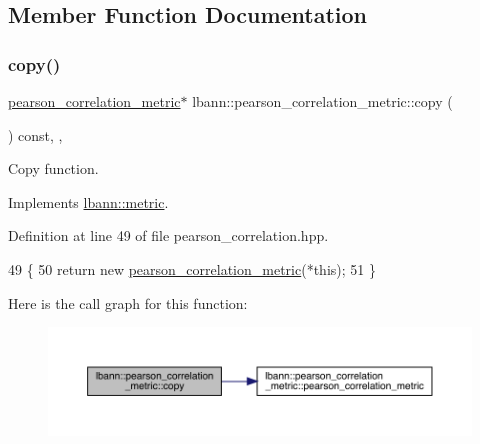 \subsection{Member Function Documentation}
\mbox{\label{classlbann_1_1pearson__correlation__metric_a2bb107028c6931a70ed7d886707b4006}} 
\subsubsection{\texorpdfstring{copy()}{copy()}}
{\footnotesize\ttfamily \hyperlink{classlbann_1_1pearson__correlation__metric}{pearson\+\_\+correlation\+\_\+metric}$\ast$ lbann\+::pearson\+\_\+correlation\+\_\+metric\+::copy (\begin{DoxyParamCaption}{ }\end{DoxyParamCaption}) const\hspace{0.3cm}{\ttfamily [inline]}, {\ttfamily [override]}, {\ttfamily [virtual]}}

Copy function. 

Implements \hyperlink{classlbann_1_1metric_a2a4498d41f77da8585552f485caab167}{lbann\+::metric}.



Definition at line 49 of file pearson\+\_\+correlation.\+hpp.


\begin{DoxyCode}
49                                                     \{
50     \textcolor{keywordflow}{return} \textcolor{keyword}{new} \hyperlink{classlbann_1_1pearson__correlation__metric_ac0d93a18b2eb500db51f40311a3b3634}{pearson\_correlation\_metric}(*\textcolor{keyword}{this});
51   \}
\end{DoxyCode}
Here is the call graph for this function\+:\nopagebreak
\begin{figure}[H]
\begin{center}
\leavevmode
\includegraphics[width=350pt]{classlbann_1_1pearson__correlation__metric_a2bb107028c6931a70ed7d886707b4006_cgraph}
\end{center}
\end{figure}
\mbox{\label{classlbann_1_1pearson__correlation__metric_a28453718aa09d609ef5ab157823d8c24}} 
